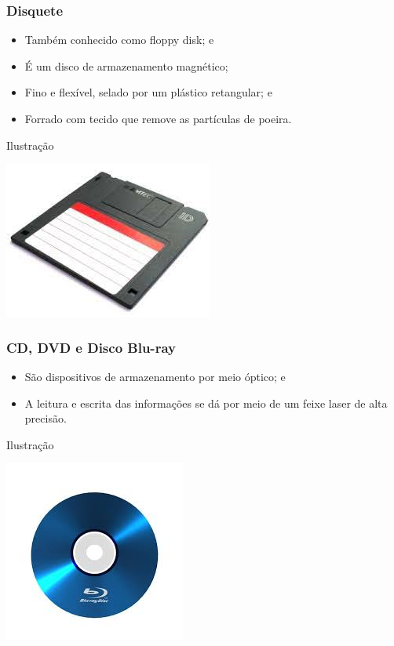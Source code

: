 \documentclass[aspectratio=169]{beamer} %
\begin{document}
\begin{frame}
	\frametitle{Disquete}
		
	\begin{itemize}
		\item Também conhecido como floppy disk; e
		\item É um disco de armazenamento magnético;
		\item Fino e flexível, selado por um plástico retangular; e 
		\item Forrado com tecido que remove as partículas de poeira.
	\end{itemize}\vfill
	
	\begin{exampleblock}{Ilustra\c cão}
		\begin{center}
			\includegraphics[scale=0.4]{img/disquete}
		\end{center}
	\end{exampleblock}
\end{frame}

\begin{frame}
	\frametitle{CD, DVD e Disco Blu-ray}
		
	\begin{itemize}
		\item São dispositivos de armazenamento por meio óptico; e
		\item A leitura e escrita das informações se dá por meio de um feixe laser de alta precisão.
	\end{itemize}\vfill
	
	\begin{exampleblock}{Ilustra\c cão}
		\begin{center}
			\includegraphics[scale=0.4]{img/cd}
		\end{center}
	\end{exampleblock}
\end{frame}
\end{document}
